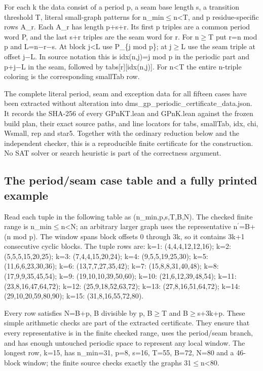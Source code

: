 \documentclass[11pt,a4paper]{article}
\begin{document}
For each k the data consist of a period p, a seam base length s, a transition threshold T, literal small-graph patterns for n\_min\ensuremath{\leq}n<T, and p residue-specific rows A\_r. Each A\_r has length p+s+r. Its first p triples are a common period word P, and the last s+r triples are the seam word for r. For n\ensuremath{\geq}T put r=n mod p and L=n\ensuremath{-}r\ensuremath{-}s. At block j<L use P\_\{j mod p\}; at j\ensuremath{\geq}L use the seam triple at offset j\ensuremath{-}L. In source notation this is idx(n,j)=j mod p in the periodic part and p+j\ensuremath{-}L in the seam, followed by tabs[r][idx(n,j)]. For n<T the entire n-triple coloring is the corresponding smallTab row.

The complete literal period, seam and exception data for all fifteen cases have been extracted without alteration into dms\_gp\_periodic\_certificate\_data.json. It records the SHA-256 of every GPnKT.lean and GPnK.lean against the frozen build plan, their exact source paths, and line locators for tabs, smallTab, idx, chi, Wsmall, rep and star5. Together with the ordinary reduction below and the independent checker, this is a reproducible finite certificate for the construction. No SAT solver or search heuristic is part of the correctness argument.

\subsection{The period/seam case table and a fully printed example}
Read each tuple in the following table as (n\_min,p,s,T,B,N). The checked finite range is n\_min\ensuremath{\leq}n<N; an arbitrary larger graph uses the representative n\ensuremath{^{\prime}}=B+(n mod p). The window spans block offsets 0 through 3k, so it contains 3k+1 consecutive cyclic blocks. The tuple rows are: k=1: (4,4,4,12,12,16); k=2: (5,5,5,15,20,25); k=3: (7,4,4,15,20,24); k=4: (9,5,5,19,25,30); k=5: (11,6,6,23,30,36); k=6: (13,7,7,27,35,42); k=7: (15,8,8,31,40,48); k=8: (17,9,9,35,45,54); k=9: (19,10,10,39,50,60); k=10: (21,6,12,39,48,54); k=11: (23,8,16,47,64,72); k=12: (25,9,18,52,63,72); k=13: (27,8,16,51,64,72); k=14: (29,10,20,59,80,90); k=15: (31,8,16,55,72,80).

Every row satisfies N=B+p, B divisible by p, B\ensuremath{\geq}T and B\ensuremath{\geq}s+3k+p. These simple arithmetic checks are part of the extracted certificate. They ensure that every representative is in the finite checked range, uses the period/seam branch, and has enough untouched periodic space to represent any local window. The longest row, k=15, has n\_min=31, p=8, s=16, T=55, B=72, N=80 and a 46-block window; the finite source checks exactly the graphs 31\ensuremath{\leq}n<80.
\end{document}
